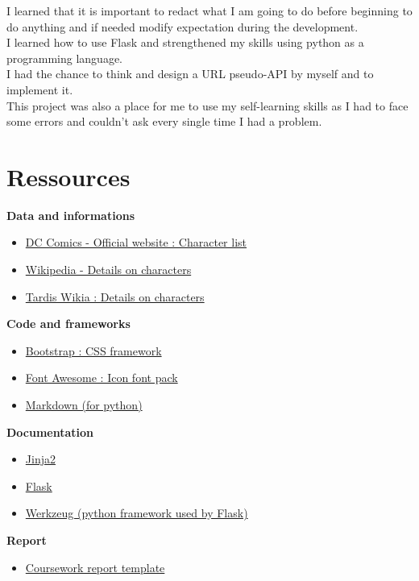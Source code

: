 \documentclass[10pt, a4paper]{article}
\begin{document}
	I learned that it is important to redact what I am going to do before beginning to do anything and if needed modify expectation during the development.\\	
	I learned how to use Flask and strengthened my skills using python as a programming language.\\	
	I had the chance to think and design a URL pseudo-API by myself and to implement it. \\
	This project was also a place for me to use my self-learning skills as I had to face some errors and couldn't ask every single time I had a problem.
	
	\section{Ressources}
	\textbf{Data and informations}
	\begin{itemize}
		\item \href{http://www.dccomics.com/characters}{DC Comics - Official website : Character list}
		\item \href{https://www.wikipedia.org/}{Wikipedia - Details on characters}
		\item \href{http://tardis.wikia.com/wiki/}{Tardis Wikia : Details on characters}
	\end{itemize}
	\textbf{Code and frameworks}
	\begin{itemize}
		\item \href{http://getbootstrap.com}{Bootstrap : CSS framework}
		\item \href{http://fontawesome.io/}{Font Awesome : Icon font pack}
		\item \href{http://pythonhosted.org/Markdown/index.html}{Markdown (for python)}
	\end{itemize}
	\textbf{Documentation}
	\begin{itemize}
		\item \href{http://jinja.pocoo.org/docs/dev/}{Jinja2}
		\item \href{http://flask.pocoo.org/docs/0.11/api}{Flask}
		\item \href{http://werkzeug.pocoo.org/docs/0.11/}{Werkzeug (python framework used by Flask)}
	\end{itemize}
	\textbf{Report}
	\begin{itemize}
		\item \href{https://github.com/edinburgh-napier/aux_latex_cw_template}{Coursework report template}
	\end{itemize}
		
\end{document}
